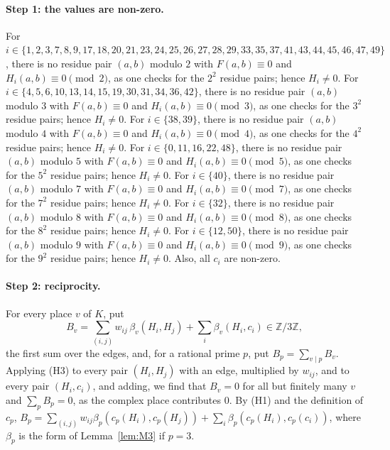 \documentclass[11pt]{article}
\newcommand{\Z}{\mathbb{Z}}
\begin{document}
\paragraph{Step 1: the values are non-zero.} For $i\in\{1,\allowbreak 2,\allowbreak 3,\allowbreak 7,\allowbreak 8,\allowbreak 9,\allowbreak 17,\allowbreak 18,\allowbreak 20,\allowbreak 21,\allowbreak 23,\allowbreak 24,\allowbreak 25,\allowbreak 26,\allowbreak 27,\allowbreak 28,\allowbreak 29,\allowbreak 33,\allowbreak 35,\allowbreak 37,\allowbreak 41,\allowbreak 43,\allowbreak 44,\allowbreak 45,\allowbreak 46,\allowbreak 47,\allowbreak 49\}$, there is no residue pair $(a,b)$ modulo $2$ with $F(a,b)\equiv0$ and $H_i(a,b)\equiv0\pmod{2}$, as one checks for the $2^2$ residue pairs; hence $H_i\neq0$. For $i\in\{4,\allowbreak 5,\allowbreak 6,\allowbreak 10,\allowbreak 13,\allowbreak 14,\allowbreak 15,\allowbreak 19,\allowbreak 30,\allowbreak 31,\allowbreak 34,\allowbreak 36,\allowbreak 42\}$, there is no residue pair $(a,b)$ modulo $3$ with $F(a,b)\equiv0$ and $H_i(a,b)\equiv0\pmod{3}$, as one checks for the $3^2$ residue pairs; hence $H_i\neq0$. For $i\in\{38,\allowbreak 39\}$, there is no residue pair $(a,b)$ modulo $4$ with $F(a,b)\equiv0$ and $H_i(a,b)\equiv0\pmod{4}$, as one checks for the $4^2$ residue pairs; hence $H_i\neq0$. For $i\in\{0,\allowbreak 11,\allowbreak 16,\allowbreak 22,\allowbreak 48\}$, there is no residue pair $(a,b)$ modulo $5$ with $F(a,b)\equiv0$ and $H_i(a,b)\equiv0\pmod{5}$, as one checks for the $5^2$ residue pairs; hence $H_i\neq0$. For $i\in\{40\}$, there is no residue pair $(a,b)$ modulo $7$ with $F(a,b)\equiv0$ and $H_i(a,b)\equiv0\pmod{7}$, as one checks for the $7^2$ residue pairs; hence $H_i\neq0$. For $i\in\{32\}$, there is no residue pair $(a,b)$ modulo $8$ with $F(a,b)\equiv0$ and $H_i(a,b)\equiv0\pmod{8}$, as one checks for the $8^2$ residue pairs; hence $H_i\neq0$. For $i\in\{12,\allowbreak 50\}$, there is no residue pair $(a,b)$ modulo $9$ with $F(a,b)\equiv0$ and $H_i(a,b)\equiv0\pmod{9}$, as one checks for the $9^2$ residue pairs; hence $H_i\neq0$. Also, all $c_i$ are non-zero.

\paragraph{Step 2: reciprocity.} For every place $v$ of $K$, put
\begin{equation}\label{eq:B}
B_v=\sum_{(i,j)}w_{ij}\,\beta_v(H_i,H_j)+\sum_i\beta_v(H_i,c_i)\in\Z/3\Z,
\end{equation}
the first sum over the edges, and, for a rational prime $p$, put $B_p=\sum_{v\mid p}B_v$. Applying (H3) to every pair $(H_i,H_j)$ with an edge, multiplied by $w_{ij}$, and to every pair $(H_i,c_i)$, and adding, we find that $B_v=0$ for all but finitely many $v$ and $\sum_pB_p=0$, as the complex place contributes $0$. By (H1) and the definition of $c_p$, $B_p=\sum_{(i,j)}w_{ij}\beta_p(c_p(H_i),c_p(H_j))+\sum_i\beta_p(c_p(H_i),c_p(c_i))$, where $\beta_p$ is the form of Lemma~\ref{lem:M3} if $p=3$.
\end{document}
